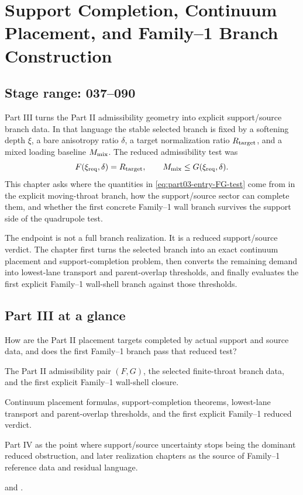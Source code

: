 \chapter{Support Completion, Continuum Placement, and Family--1 Branch Construction}
\label{chap:part03_support_family1}
\section*{Stage range: 037--090}

Part III turns the Part II admissibility geometry into explicit support/source branch data.  In that language the stable selected branch is fixed by a softening depth \(\xi\), a bare anisotropy ratio \(\delta\), a target normalization ratio \(R_{\rm target}\), and a mixed loading baseline \(M_{\rm mix}\).  The reduced admissibility test was
\begin{equation}
\label{eq:part03-entry-FG-test}
F(\xi_{\rm req},\delta)=R_{\rm target},
\qquad
M_{\rm mix}\leq G(\xi_{\rm req},\delta).
\end{equation}
This chapter asks where the quantities in \eqref{eq:part03-entry-FG-test} come from in the explicit moving-throat branch, how the support/source sector can complete them, and whether the first concrete Family--1 wall branch survives the support side of the quadrupole test.

The endpoint is not a full branch realization.  It is a reduced support/source verdict.  The chapter first turns the selected branch into an exact continuum placement and support-completion problem, then converts the remaining demand into lowest-lane transport and parent-overlap thresholds, and finally evaluates the first explicit Family--1 wall-shell branch against those thresholds.

\section*{Part III at a glance}

\begin{readermap}
\item[Primary question] How are the Part II placement targets completed by actual support and source data, and does the first Family--1 branch pass that reduced test?
\item[Starting inputs] The Part II admissibility pair \((F,G)\), the selected finite-throat branch data, and the first explicit Family--1 wall-shell closure.
\item[Delivers] Continuum placement formulas, support-completion theorems, lowest-lane transport and parent-overlap thresholds, and the first explicit Family--1 reduced verdict.
\item[Used by] Part IV as the point where support/source uncertainty stops being the dominant reduced obstruction, and later realization chapters as the source of Family--1 reference data and residual language.
\item[Result anchors]  and .
\end{readermap}

